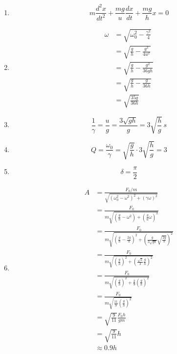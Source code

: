 \documentclass{article}
\begin{document}
\begin{enumerate}
  \item \[m \frac{d^2 x}{d t^2} + \frac{m g}{u} \frac{d x}{d t} + \frac{m g}{h} x = 0\]

  \item

        \begin{align*}
          \omega & = \sqrt{\omega_0^2 - \frac{\gamma^2}{4}}  \\
                 & = \sqrt{\frac{g}{h} - \frac{g^2}{4 u^2}}  \\
                 & = \sqrt{\frac{g}{h} - \frac{g^2}{36 g h}} \\
                 & = \sqrt{\frac{g}{h} - \frac{g}{36 h}}     \\
                 & = \sqrt{\frac{35 g}{36 h}}
        \end{align*}

  \item \[\frac{1}{\gamma} = \frac{u}{g} = \frac{3 \sqrt{g h}}{g} = 3 \sqrt{\frac{h}{g}} \,\unit{s}\]

  \item \[Q = \frac{\omega_0}{\gamma} = \sqrt{\frac{g}{h}} \cdot 3 \sqrt{\frac{h}{g}} = 3\]

  \item \[\delta = \frac{\pi}{2}\]

  \item

        \begin{align*}
          A & = \frac{F_0 / m}{\sqrt{(\omega_0^2 - \omega^2)^2 + (\gamma \omega)^2}}                                                             \\
            & = \frac{F_0}{m \sqrt{\left( \frac{g}{h} - \omega^2 \right) + \left( \frac{g}{u} \omega \right)^2}}                                 \\
            & = \frac{F_0}{m \sqrt{\left( \frac{g}{h} - \frac{2 g}{h} \right)^2 + \left( \frac{g}{3 \sqrt{g h}} \sqrt{\frac{2 g}{h}} \right)^2}} \\
            & = \frac{F_0}{m \sqrt{\left( \frac{g}{h} \right)^2 + \left( \frac{\sqrt{2}}{3} \frac{g}{h} \right)^2}}                              \\
            & = \frac{F_0}{m \sqrt{\left( \frac{g}{h} \right)^2 + \frac{2}{9} \left( \frac{g}{h} \right)^2}}                                     \\
            & = \frac{F_0}{m \sqrt{\frac{11}{9} \left( \frac{g}{h} \right)^2}}                                                                   \\
            & = \sqrt{\frac{9}{11}} \frac{F_0 h}{g m}                                                                                            \\
            & = \sqrt{\frac{9}{11}} h                                                                                                            \\
            & \approx 0.9 h
        \end{align*}
\end{enumerate}
\end{document}
